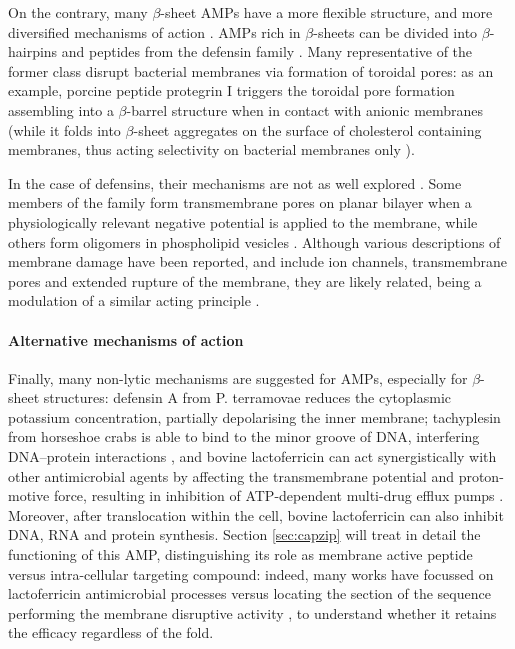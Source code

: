 On the contrary, many $\beta$-sheet AMPs have a more flexible structure, and more diversified mechanisms of action \cite{??}.
%
AMPs rich in $\beta$-sheets can be divided into $\beta$-hairpins and peptides from the defensin family \cite{Nguyen2011}.
%
Many representative of the former class disrupt bacterial membranes via formation of toroidal pores: as an example, porcine peptide protegrin I triggers the toroidal pore formation assembling into a $\beta$-barrel structure when in contact with anionic membranes (while it folds into $\beta$-sheet aggregates on the surface of cholesterol containing membranes, thus acting selectivity on bacterial membranes only \cite{Tang2009}).

In the case of defensins, their mechanisms are not as well explored \cite{Lehrer2004,Zasloff2002,Fujii1993}.
%
Some members of the family form transmembrane pores on planar bilayer when a physiologically relevant negative potential is applied to the membrane,\cite{Kagan1990} while others form oligomers in phospholipid vesicles \cite{Takeuchi2004}.
%
Although various descriptions of membrane damage have been reported, and include ion channels, transmembrane pores and extended rupture of the membrane, they are likely related, being a modulation of a similar acting principle \cite{Dathe1999}.


\paragraph{Alternative mechanisms of action} Finally, many non-lytic mechanisms are suggested for AMPs, especially for $\beta$-sheet structures: defensin A from P. terramovae reduces the cytoplasmic potassium concentration, partially depolarising the inner membrane; tachyplesin from horseshoe crabs is able to bind to the minor groove of DNA, interfering DNA–protein interactions \cite{Yonezawa1992},
%
and bovine lactoferricin can act synergistically with other antimicrobial agents by affecting the transmembrane potential and proton-motive force, resulting in inhibition of ATP-dependent multi-drug efflux pumps \cite{Gifford2005}.
%
Moreover, after translocation within the cell, bovine lactoferricin can also inhibit DNA, RNA and protein synthesis. Section \ref{sec:capzip} will treat in detail the functioning of this AMP, distinguishing its role as membrane active peptide versus intra-cellular targeting compound: indeed, many works have focussed on lactoferricin antimicrobial processes versus locating the section of the sequence performing the membrane disruptive activity \cite{Tomita1994,Hwang1998,Schibli1999,Nguyen2005}, to understand whether it retains the efficacy regardless of the fold.

